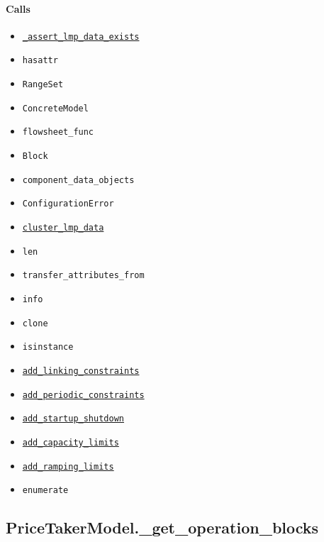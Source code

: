 \documentclass[11pt]{report}
\begin{document}
\paragraph{Calls}
\begin{itemize}[leftmargin=*]
  \item \hyperref[def:pricetaker-price_taker_model.py:PriceTakerModel._assert_lmp_data_exists:L213]{\texttt{\_assert\_lmp\_data\_exists}}
  \item \texttt{hasattr}
  \item \texttt{RangeSet}
  \item \texttt{ConcreteModel}
  \item \texttt{flowsheet\_func}
  \item \texttt{Block}
  \item \texttt{component\_data\_objects}
  \item \texttt{ConfigurationError}
  \item \hyperref[def:pricetaker-clustering.py:cluster_lmp_data:L76]{\texttt{cluster\_lmp\_data}}
  \item \texttt{len}
  \item \texttt{transfer\_attributes\_from}
  \item \texttt{info}
  \item \texttt{clone}
  \item \texttt{isinstance}
  \item \hyperref[def:pricetaker-price_taker_model.py:PriceTakerModel.add_linking_constraints:L564]{\texttt{add\_linking\_constraints}}
  \item \hyperref[def:pricetaker-price_taker_model.py:PriceTakerModel.add_periodic_constraints:L598]{\texttt{add\_periodic\_constraints}}
  \item \hyperref[def:pricetaker-price_taker_model.py:PriceTakerModel.add_startup_shutdown:L813]{\texttt{add\_startup\_shutdown}}
  \item \hyperref[def:pricetaker-price_taker_model.py:PriceTakerModel.add_capacity_limits:L654]{\texttt{add\_capacity\_limits}}
  \item \hyperref[def:pricetaker-price_taker_model.py:PriceTakerModel.add_ramping_limits:L723]{\texttt{add\_ramping\_limits}}
  \item \texttt{enumerate}
\end{itemize}
\subsection{PriceTakerModel.\_get\_operation\_blocks}
\label{def:pricetaker-price_taker_model.py:PriceTakerModel._get_operation_blocks:L445}
\end{document}
